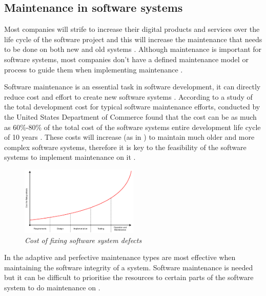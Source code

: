 \subsection{Maintenance in software systems}
Most companies will strife to increase their digital products and services over the life cycle of the software project and this will increase the maintenance that needs to be done on both new and old systems \cite{Niu2018, Galster2019, Hasan2012}. Although maintenance is important for software systems, most companies don't have a defined maintenance model or process to guide them when implementing maintenance \cite{Stojanov2017}. \par Software maintenance is an essential task in software development, it can directly reduce cost and effort to create new software systems \cite{FrancisThamburaj2017}. According to a study of the total development cost for typical software maintenance efforts, conducted by the United States Department of Commerce found that the cost can be as much as $60\%$-$80\%$ of the total cost of the software systems entire development life cycle of 10 years \cite{Ogheneovo2014, Stark1996, Ackermann2009,Tang2010}. These costs will increase (as in ) to maintain much older and more complex software systems, therefore it is key to the feasibility of the software systems to implement maintenance on it \cite{Alenezi2016, Booch1986}.

\begin{figure}[h!] %
	\centering %
	\includegraphics[width=0.5\textwidth]{Images/Chapter1/Background/Cost_of_fixing_bugs/Cost_of_fixing_bugs.pdf}
	\caption[Cost of fixing software system defects]
	{\textit{Cost of fixing software system defects \cite{Ogheneovo2014}}}\label{fig:CH1_Costs_of_fixing_bugs}
\end{figure} 

In  the adaptive and perfective maintenance types are most effective when maintaining the software integrity of a system. Software maintenance is needed but it can be difficult to prioritise the resources to certain parts of the software system to do maintenance on \cite{Mamone1994, Hasan2012}.

